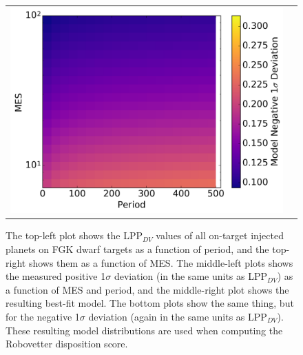 \begin{figure}[hp]
\begin{tabular}{cc}
\includegraphics[width=0.5\linewidth]{ScoreFig-6.pdf}
\end{tabular}
\caption{The top-left plot shows the LPP$_{DV}$ values of all on-target injected planets on FGK dwarf targets as a function of period, and the top-right shows them as a function of MES. The middle-left plots shows the measured positive 1$\sigma$ deviation (in the same units as LPP$_{DV}$) as a function of MES and period, and the middle-right plot shows the resulting best-fit model. The bottom plots show the same thing, but for the negative 1$\sigma$ deviation (again in the same units as LPP$_{DV}$). These resulting model distributions are used when computing the Robovetter disposition score.}
\label{score-fig-1}
\end{figure}
